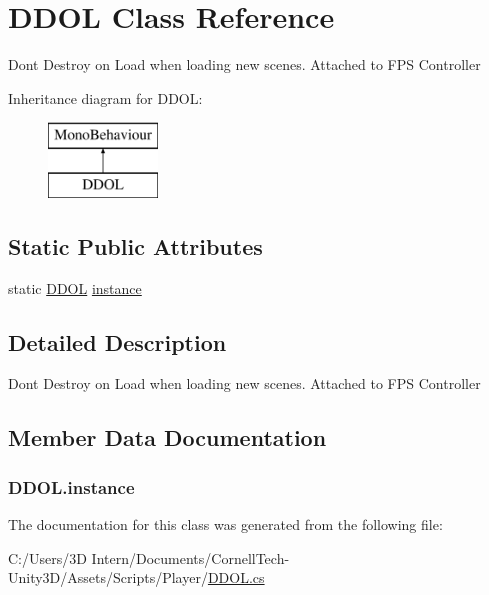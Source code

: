 \hypertarget{class_d_d_o_l}{}\section{D\+D\+OL Class Reference}
\label{class_d_d_o_l}


Don\textquotesingle{}t Destroy on Load when loading new scenes. Attached to F\+PS Controller  


Inheritance diagram for D\+D\+OL\+:\begin{figure}[H]
\begin{center}
\leavevmode
\includegraphics[height=2.000000cm]{class_d_d_o_l}
\end{center}
\end{figure}
\subsection*{Static Public Attributes}
\begin{DoxyCompactItemize}
\item 
static \hyperlink{class_d_d_o_l}{D\+D\+OL} \hyperlink{class_d_d_o_l_a933396e9e03db1074e01bc01993f3686}{instance}
\end{DoxyCompactItemize}


\subsection{Detailed Description}
Don\textquotesingle{}t Destroy on Load when loading new scenes. Attached to F\+PS Controller 



\subsection{Member Data Documentation}
\subsubsection[{\texorpdfstring{instance}{instance}}]{ D\+D\+O\+L.\+instance\hspace{0.3cm}{\ttfamily [static]}}\hypertarget{class_d_d_o_l_a933396e9e03db1074e01bc01993f3686}{}\label{class_d_d_o_l_a933396e9e03db1074e01bc01993f3686}


The documentation for this class was generated from the following file\+:\begin{DoxyCompactItemize}
\item 
C\+:/\+Users/3\+D Intern/\+Documents/\+Cornell\+Tech-\/\+Unity3\+D/\+Assets/\+Scripts/\+Player/\hyperlink{_d_d_o_l_8cs}{D\+D\+O\+L.\+cs}\end{DoxyCompactItemize}
